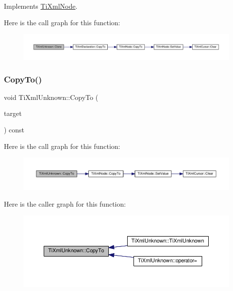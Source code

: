 Implements \hyperlink{class_ti_xml_node_a4508cc3a2d7a98e96a54cc09c37a78a4}{Ti\+Xml\+Node}.

Here is the call graph for this function\+:
\nopagebreak
\begin{figure}[H]
\begin{center}
\leavevmode
\includegraphics[width=350pt]{class_ti_xml_unknown_a3dea7689de5b1931fd6657992948fde0_cgraph}
\end{center}
\end{figure}
\mbox{\label{class_ti_xml_unknown_afeb334446bcbe13ce15131e1629712be}} 
\subsubsection{\texorpdfstring{Copy\+To()}{CopyTo()}}
{\footnotesize\ttfamily void Ti\+Xml\+Unknown\+::\+Copy\+To (\begin{DoxyParamCaption}\item[{\hyperlink{class_ti_xml_unknown}{Ti\+Xml\+Unknown} $\ast$}]{target }\end{DoxyParamCaption}) const\hspace{0.3cm}{\ttfamily [protected]}}

Here is the call graph for this function\+:
\nopagebreak
\begin{figure}[H]
\begin{center}
\leavevmode
\includegraphics[width=350pt]{class_ti_xml_unknown_afeb334446bcbe13ce15131e1629712be_cgraph}
\end{center}
\end{figure}
Here is the caller graph for this function\+:
\nopagebreak
\begin{figure}[H]
\begin{center}
\leavevmode
\includegraphics[width=350pt]{class_ti_xml_unknown_afeb334446bcbe13ce15131e1629712be_icgraph}
\end{center}
\end{figure}
\mbox{\label{class_ti_xml_unknown_a60560b5aacb4bdc8b2b5f02f0a99c5c0}} 

